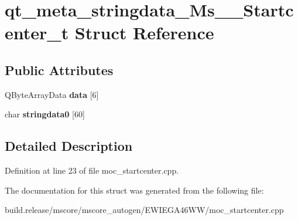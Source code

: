 \hypertarget{structqt__meta__stringdata___ms_____startcenter__t}{}\section{qt\+\_\+meta\+\_\+stringdata\+\_\+\+Ms\+\_\+\+\_\+\+Startcenter\+\_\+t Struct Reference}
\label{structqt__meta__stringdata___ms_____startcenter__t}
\subsection*{Public Attributes}
\begin{DoxyCompactItemize}
\item 
\mbox{\label{structqt__meta__stringdata___ms_____startcenter__t_aa383a4846a1aa70d0b806586e71232cd}} 
Q\+Byte\+Array\+Data {\bfseries data} \mbox{[}6\mbox{]}
\item 
\mbox{\label{structqt__meta__stringdata___ms_____startcenter__t_ace007a5cbb357bc4fa342c62ddde1496}} 
char {\bfseries stringdata0} \mbox{[}60\mbox{]}
\end{DoxyCompactItemize}


\subsection{Detailed Description}


Definition at line 23 of file moc\+\_\+startcenter.\+cpp.



The documentation for this struct was generated from the following file\+:\begin{DoxyCompactItemize}
\item 
build.\+release/mscore/mscore\+\_\+autogen/\+E\+W\+I\+E\+G\+A46\+W\+W/moc\+\_\+startcenter.\+cpp\end{DoxyCompactItemize}

